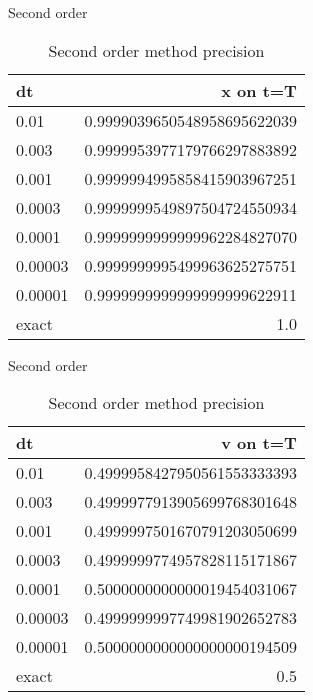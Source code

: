 \documentclass[10pt]{beamer}
\begin{document}
\begin{frame}{Second order}
  \begin{table}
    \caption{Second order method precision}
    \begin{tabular}{lr}
      \toprule
      dt & x on t=T\\
      \midrule
      0.01 &     0.9999039650548958695622039\\
      0.003 &    0.9999953977179766297883892\\
      0.001 &    0.9999994995858415903967251\\
      0.0003 &   0.9999999549897504724550934\\
      0.0001 &   0.9999999999999962284827070\\
      0.00003 &  0.9999999995499963625275751\\
      0.00001 &  0.9999999999999999999622911\\
      \midrule
      exact & 1.0 \\
      \bottomrule
    \end{tabular}
  \end{table}
\end{frame}

\begin{frame}{Second order}
  \begin{table}
    \caption{Second order method precision}
    \begin{tabular}{lr}
      \toprule
      dt & v on t=T\\
      \midrule
      0.01 &     0.4999958427950561553333393\\
      0.003 &    0.4999977913905699768301648\\
      0.001 &    0.4999997501670791203050699\\
      0.0003 &   0.4999999774957828115171867\\
      0.0001 &   0.5000000000000019454031067\\
      0.00003 &  0.4999999997749981902652783\\
      0.00001 &  0.5000000000000000000194509\\
      \midrule
      exact & 0.5 \\
      \bottomrule
    \end{tabular}
  \end{table}
\end{frame}
\end{document}
